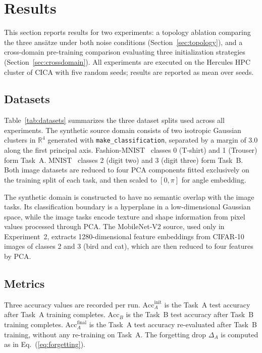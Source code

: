 \documentclass[10pt,conference]{IEEEtran}
\begin{document}
\section{Results}

This section reports results for two experiments: a topology ablation
comparing the three ans\"{a}tze under both noise conditions
(Section~\ref{sec:topology}), and a cross-domain pre-training
comparison evaluating three initialization strategies
(Section~\ref{sec:crossdomain}). All experiments are executed on the
Hercules HPC cluster of CICA with five random seeds; results are
reported as mean over seeds.

\subsection{Datasets}
\label{sec:datasets}

Table~\ref{tab:datasets} summarizes the three dataset splits used across
all experiments. The synthetic source domain consists of two isotropic
Gaussian clusters in $\mathbb{R}^4$ generated with \texttt{make\_classification},
separated by a margin of 3.0 along the first principal axis.
Fashion-MNIST~\cite{xiao2017fashion} classes 0 (T-shirt) and 1 (Trouser)
form Task~A. MNIST~\cite{lecun1998gradient} classes 2 (digit two) and
3 (digit three) form Task~B. Both image datasets are reduced to four
PCA components fitted exclusively on the training split of each task,
and then scaled to $[0, \pi]$ for angle embedding.



The synthetic domain is constructed to have no semantic overlap with the
image tasks. Its classification boundary is a hyperplane in a
low-dimensional Gaussian space, while the image tasks encode texture and
shape information from pixel values processed through PCA. The MobileNet-V2
source, used only in Experiment~2, extracts 1280-dimensional feature
embeddings from CIFAR-10 images of classes 2 and 3 (bird and cat),
which are then reduced to four features by PCA.

\subsection{Metrics}
\label{sec:metrics}

Three accuracy values are recorded per run. $\text{Acc}_A^\text{init}$
is the Task~A test accuracy after Task~A training completes.
$\text{Acc}_B$ is the Task~B test accuracy after Task~B training
completes. $\text{Acc}_A^\text{final}$ is the Task~A test accuracy
re-evaluated after Task~B training, without any re-training on Task~A.
The forgetting drop $\Delta_A$ is computed as in
Eq.~(\ref{eq:forgetting}).
\end{document}
